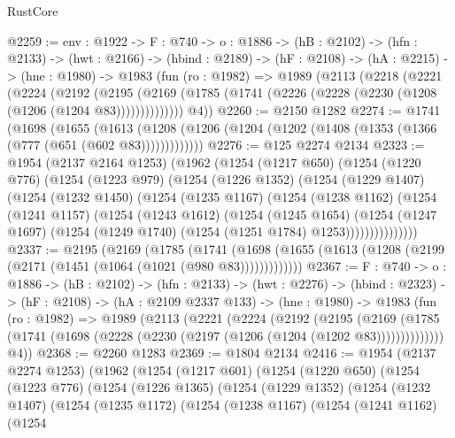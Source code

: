 \begin{lexlean}{RustCore}
\begin{coremodule}
@2259 := {env : @1922} ->
  {F : @740} ->
  {o : @1886} ->
  (hB : @2102) ->
  (hfn : @2133) ->
  (hwt : @2166) ->
  (hbind : @2189) ->
  (hF : @2108) ->
  (hA : @2215) ->
  (hne : @1980) ->
  @1983
    (fun (ro : @1982) =>
    @1989
      (@2113
        (@2218
          (@2221
            (@2224
              (@2192
                (@2195
                  (@2169 (@1785 (@1741 (@2226 (@2228 (@2230 (@1208 (@1206 (@1204 @83))))))))))))))
        @4))
@2260 := @2150 @1282
@2274 := @1741
    (@1698
      (@1655
        (@1613 (@1208 (@1206 (@1204 (@1202 (@1408 (@1353 (@1366 (@777 (@651 (@602 @83)))))))))))))
@2276 := @125 @2274 @2134
@2323 := @1954
    (@2137 @2164 @1253)
    (@1962
      (@1254
        (@1217 @650)
        (@1254
          (@1220 @776)
          (@1254
            (@1223 @979)
            (@1254
              (@1226 @1352)
              (@1254
                (@1229 @1407)
                (@1254
                  (@1232 @1450)
                  (@1254
                    (@1235 @1167)
                    (@1254
                      (@1238 @1162)
                      (@1254
                        (@1241 @1157)
                        (@1254
                          (@1243 @1612)
                          (@1254
                            (@1245 @1654)
                            (@1254
                              (@1247 @1697)
                              (@1254 (@1249 @1740) (@1254 (@1251 @1784) @1253)))))))))))))))
@2337 := @2195
    (@2169
      (@1785
        (@1741 (@1698 (@1655 (@1613 (@1208 (@2199 (@2171 (@1451 (@1064 (@1021 (@980 @83)))))))))))))
@2367 := {F : @740} ->
  {o : @1886} ->
  (hB : @2102) ->
  (hfn : @2133) ->
  (hwt : @2276) ->
  (hbind : @2323) ->
  (hF : @2108) ->
  (hA : @2109 @2337 @133) ->
  (hne : @1980) ->
  @1983
    (fun (ro : @1982) =>
    @1989
      (@2113
        (@2221
          (@2224
            (@2192
              (@2195
                (@2169
                  (@1785 (@1741 (@1698 (@2228 (@2230 (@2197 (@1206 (@1204 (@1202 @83))))))))))))))
        @4))
@2368 := @2260 @1283
@2369 := @1804 @2134
@2416 := @1954
    (@2137 @2274 @1253)
    (@1962
      (@1254
        (@1217 @601)
        (@1254
          (@1220 @650)
          (@1254
            (@1223 @776)
            (@1254
              (@1226 @1365)
              (@1254
                (@1229 @1352)
                (@1254
                  (@1232 @1407)
                  (@1254
                    (@1235 @1172)
                    (@1254
                      (@1238 @1167)
                      (@1254
                        (@1241 @1162)
                        (@1254

\end{coremodule}
\end{lexlean}
